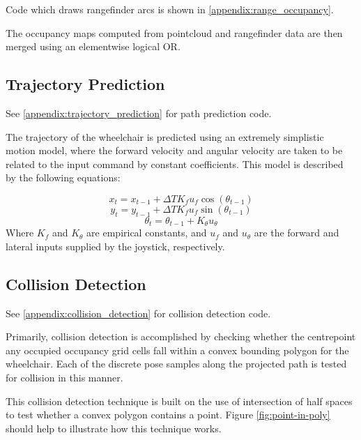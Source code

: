 \documentclass[oneside,final,a4paper]{report}
\begin{document}
Code which draws rangefinder arcs is shown in \ref{appendix:range_occupancy}.

The occupancy maps computed from pointcloud and rangefinder data are then merged using an elementwise logical OR.

\subsection{Trajectory Prediction}
\label{section:trajectory_prediction}
See \ref{appendix:trajectory_prediction} for path prediction code.

The trajectory of the wheelchair is predicted using an extremely simplistic motion model, where the forward velocity and angular velocity are taken to be related to the input command by constant coefficients.  This model is described by the following equations:

\begin{equation}
x_t = x_{t-1} + \Delta T K_f u_f \cos (\theta_{t-1})
\end{equation}
\begin{equation}
y_t = y_{t-1} + \Delta T K_f u_f \sin (\theta_{t-1})
\end{equation}
\begin{equation}
\theta_t = \theta_{t-1} + K_{\theta} u_{\theta}
\end{equation}
Where $K_f$ and $K_\theta$ are empirical constants, and $u_f$ and $u_\theta$ are the forward and lateral inputs supplied by the joystick, respectively.

\subsection{Collision Detection}
\label{section:collision_detection}
See \ref{appendix:collision_detection} for collision detection code.

Primarily, collision detection is accomplished by checking whether the centrepoint any occupied occupancy grid cells fall within a convex bounding polygon for the wheelchair.  Each of the discrete pose samples along the projected path is tested for collision in this manner.

This collision detection technique is built on the use of intersection of half spaces to test whether a convex polygon contains a point.  Figure \ref{fig:point-in-poly} should help to illustrate how this technique works.
\end{document}
